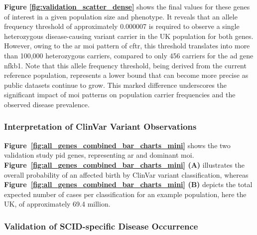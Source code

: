 \textbf{Figure \ref{fig:validation_scatter_dense}} shows the final values for these genes of interest in a given population size and phenotype. It reveals that an allele frequency threshold of approximately 0.000007 is required to observe a single heterozygous disease-causing variant carrier in the UK population for both genes. However, owing to the \ac{ar} \ac{moi} pattern of \ac{cftr}, this threshold translates into more than 100,000 heterozygous carriers, compared to only 456 carriers for the \ac{ad} gene \ac{nfkb1}. Note that this allele frequency threshold, being derived from the current reference population, represents a lower bound that can become more precise as public datasets continue to grow. This marked difference underscores the significant impact of \ac{moi} patterns on population carrier frequencies and the observed disease prevalence.




\FloatBarrier
\subsubsection{Interpretation of ClinVar Variant Observations}

\textbf{Figure~\ref{fig:all_genes_combined_bar_charts_mini}} shows  the two validation study \ac{pid} genes, representing \ac{ar} and dominant \ac{moi}. \textbf{Figure~\ref{fig:all_genes_combined_bar_charts_mini} (A)}   illustrates the overall probability of an affected birth by ClinVar variant classification, whereas \textbf{Figure~\ref{fig:all_genes_combined_bar_charts_mini}  (B)}  depicts the total expected number of cases per classification for an example population, here the UK, of approximately 69.4 million. 

\subsubsection{Validation of SCID-specific Disease Occurrence}

